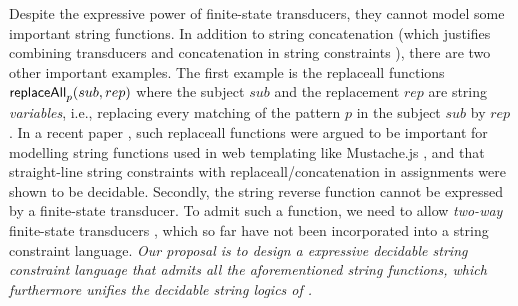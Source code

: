 
Despite the expressive power of finite-state transducers, 
they cannot model some important string functions. In addition to string
concatenation (which justifies combining transducers and concatenation in 
string constraints \cite{LB16}), there are two other important examples. The 
first example is the replaceall functions $\mathsf{replaceAll}_p(sub,rep)$ where the subject $sub$ and the replacement 
$rep$ are string \emph{variables}, i.e., 
replacing every matching of the pattern $p$ in the subject $sub$ by $rep$.
In a recent paper \cite{CCHLW18},
such replaceall functions were argued to be important for modelling string 
functions used in web templating like Mustache.js \cite{Mustache}, and
that straight-line string constraints with replaceall/concatenation in 
assignments were shown to be decidable.
Secondly, the string reverse function cannot be expressed by a finite-state
transducer. To admit such a function, we need to allow \emph{two-way} 
finite-state transducers \cite{Berstel,Sakarovitch}, which so far have not 
been incorporated into a string constraint language. \emph{Our proposal is to
design a expressive decidable string constraint language that admits all the
aforementioned string functions, which furthermore unifies the decidable string 
logics of \cite{CCHLW18,LB16}.}



%
%

